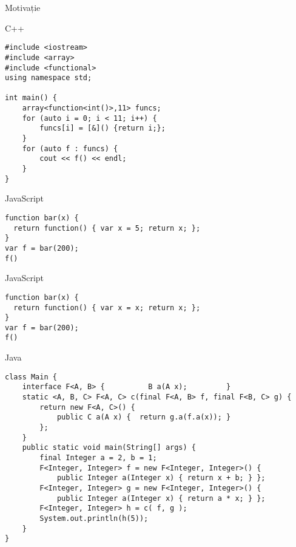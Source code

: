 \documentclass[xcolor=pdftex,romanian,colorlinks]{beamer}
\begin{document}
\begin{section}{Motivație}
\begin{frame}[fragile]{C++}
\begin{verbatim}
#include <iostream>
#include <array>
#include <functional>
using namespace std;

int main() {
    array<function<int()>,11> funcs;
    for (auto i = 0; i < 11; i++) {
    	funcs[i] = [&]() {return i;};
    }
    for (auto f : funcs) {
    	cout << f() << endl;
    }
}
\end{verbatim}
\end{frame}

\begin{frame}[fragile]{JavaScript}
\begin{verbatim}
function bar(x) { 
  return function() { var x = 5; return x; }; 
}
var f = bar(200);
f()
\end{verbatim}
\end{frame}

\begin{frame}[fragile]{JavaScript}
\begin{verbatim}
function bar(x) { 
  return function() { var x = x; return x; }; 
}
var f = bar(200);
f()
\end{verbatim}
\end{frame}

\begin{frame}[fragile]{Java}
\small{\begin{verbatim}
class Main {
    interface F<A, B> {          B a(A x);         }
    static <A, B, C> F<A, C> c(final F<A, B> f, final F<B, C> g) {
        return new F<A, C>() { 
            public C a(A x) {  return g.a(f.a(x)); }
        };
    }
    public static void main(String[] args) {
        final Integer a = 2, b = 1;
        F<Integer, Integer> f = new F<Integer, Integer>() { 
            public Integer a(Integer x) { return x + b; } };
        F<Integer, Integer> g = new F<Integer, Integer>() { 
            public Integer a(Integer x) { return a * x; } };
        F<Integer, Integer> h = c( f, g );
        System.out.println(h(5));
    }
}
\end{verbatim}}
\end{frame}


\end{section}
\end{document}
